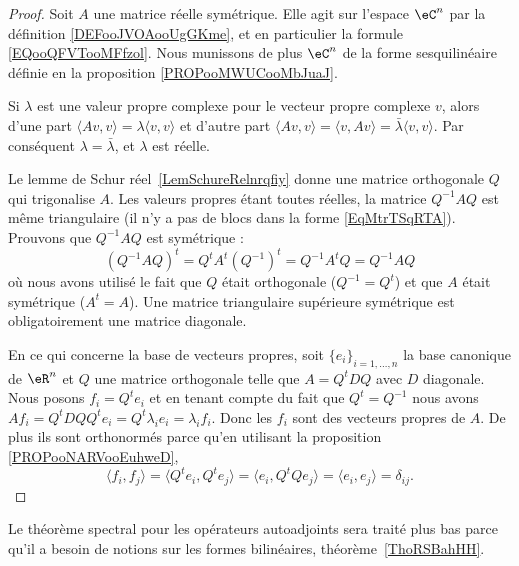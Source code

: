 \begin{proof}
	Soit \( A\) une matrice réelle symétrique. Elle agit sur l'espace \( \eC^n\) par la définition \ref{DEFooJVOAooUgGKme}, et en particulier la formule \ref{EQooQFVTooMFfzol}. Nous munissons de plus \( \eC^n\) de la forme sesquilinéaire définie en la proposition \ref{PROPooMWUCooMbJuaJ}.

	Si \( \lambda\) est une valeur propre complexe pour le vecteur propre complexe \( v\), alors d'une part \( \langle Av, v\rangle =\lambda\langle v, v\rangle \) et d'autre part \( \langle Av, v\rangle =\langle v, Av\rangle =\bar\lambda\langle v, v\rangle \). Par conséquent \( \lambda=\bar\lambda\), et \( \lambda\) est réelle.

	Le lemme de Schur réel~\ref{LemSchureRelnrqfiy} donne une matrice orthogonale \( Q\) qui trigonalise \( A\). Les valeurs propres étant toutes réelles, la matrice \( Q^{-1}AQ\) est même triangulaire (il n'y a pas de blocs dans la forme \eqref{EqMtrTSqRTA}). Prouvons que \( Q^{-1}AQ\) est symétrique :
	\begin{equation}
		(Q^{-1}AQ)^t=Q^tA^t(Q^{-1})^t=Q^{-1}A^tQ=Q^{-1}AQ
	\end{equation}
	où nous avons utilisé le fait que \( Q\) était orthogonale (\( Q^{-1}=Q^t\)) et que \( A\) était symétrique (\( A^t=A\)). Une matrice triangulaire supérieure symétrique est obligatoirement une matrice diagonale.

	En ce qui concerne la base de vecteurs propres, soit \( \{ e_i \}_{i=1,\ldots, n}\) la base canonique de \( \eR^n\) et \( Q\) une matrice orthogonale telle que \( A=Q^tDQ\) avec \( D\) diagonale. Nous posons \( f_i=Q^te_i\) et en tenant compte du fait que \( Q^t=Q^{-1}\) nous avons \( Af_i=Q^tDQQ^te_i=Q^t\lambda_i e_i=\lambda_if_i\). Donc les \( f_i\) sont des vecteurs propres de \( A\). De plus ils sont orthonormés parce qu'en utilisant la proposition \ref{PROPooNARVooEuhweD},
	\begin{equation}
		\langle f_i, f_j\rangle =\langle Q^te_i, Q^te_j\rangle =\langle e_i, Q^tQe_j\rangle =\langle e_i, e_j\rangle =\delta_{ij}.
	\end{equation}
\end{proof}
Le théorème spectral pour les opérateurs autoadjoints sera traité plus bas parce qu'il a besoin de notions sur les formes bilinéaires, théorème~\ref{ThoRSBahHH}.


